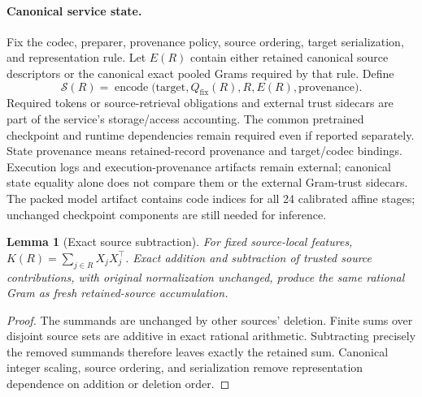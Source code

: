 \documentclass[10pt,twocolumn,letterpaper]{article}
\newtheorem{lemma}{Lemma}
\newcommand{\calS}{\mathcal{S}}
\newcommand{\Qfix}{Q_{\mathrm{fix}}}
\begin{document}
\paragraph{Canonical service state.}
Fix the codec, preparer, provenance policy, source ordering, target serialization,
and representation rule. Let $E(R)$ contain either retained canonical source
descriptors or the canonical exact pooled Grams required by that rule. Define
\begin{equation}
 \calS(R)=\operatorname{encode}\bigl(
   \text{target},\Qfix(R),R,E(R),\text{provenance}\bigr).
 \label{eq:state}
\end{equation}
Required tokens or source-retrieval obligations and external trust sidecars are
part of the service's storage/access accounting. The common pretrained checkpoint
and runtime dependencies remain required even if reported separately.
State provenance means retained-record provenance and target/codec bindings.
Execution logs and execution-provenance artifacts remain external; canonical
state equality alone does not compare them or the external Gram-trust sidecars.
The packed model artifact contains code indices for all 24 calibrated affine
stages; unchanged checkpoint components are still needed for inference.

\begin{lemma}[Exact source subtraction]
For fixed source-local features, $K(R)=\sum_{j\in R}X_jX_j^\top$. Exact addition and
subtraction of trusted source contributions, with original normalization
unchanged, produce the same rational Gram as fresh retained-source accumulation.
\end{lemma}
\begin{proof}
The summands are unchanged by other sources' deletion. Finite sums over disjoint
source sets are additive in exact rational arithmetic. Subtracting precisely the
removed summands therefore leaves exactly the retained sum. Canonical integer
scaling, source ordering, and serialization remove representation dependence on
addition or deletion order.
\end{proof}
\end{document}
